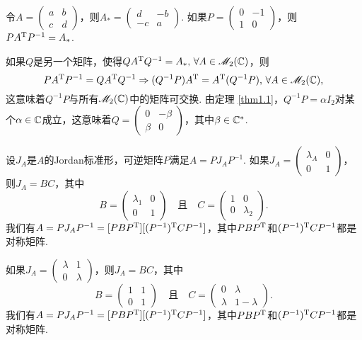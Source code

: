 \begin{solution}
  令$A=\begin{pmatrix}
    a & b \\
    c & d
  \end{pmatrix}$，则$A_\ast=\begin{pmatrix}
    d & -b \\
    -c & a
  \end{pmatrix}$. 如果$P=\begin{pmatrix}
    0 & -1 \\
    1 & 0
  \end{pmatrix}$，则$PA^{\mathrm T} P^{-1}=A_\ast$.

  如果$Q$是另一个矩阵，使得$QA^{\mathrm T} Q^{-1}=A_\ast,\,\forall A\in\mathscr M_2(\mathbb C)$，则
  \[
    PA^{\mathrm T} P^{-1}=QA^{\mathrm T} Q^{-1}\Rightarrow (Q^{-1}P)A^{\mathrm T}=A^{\mathrm T}(Q^{-1}P),\,\forall A\in\mathscr M_2(\mathbb C),
  \]
  这意味着$Q^{-1}P$与所有$\mathscr M_2(\mathbb C)$中的矩阵可交换. 由定理 \ref{thm1.1}，$Q^{-1}P=\alpha I_2$对某个$\alpha\in\mathbb C$成立，这意味着$Q=\begin{pmatrix}
    0 & -\beta \\
    \beta & 0
  \end{pmatrix}$，其中$\beta\in\mathbb C^\ast$.
\end{solution}

\begin{solution}
  设$J_A$是$A$的Jordan标准形，可逆矩阵$P$满足$A=PJ_AP^{-1}$. 如果$J_A=\begin{pmatrix}
    \lambda_A & 0 \\
    0 & 1
  \end{pmatrix}$，则$J_A=BC$，其中
  \[
    B = \begin{pmatrix}
      \lambda_1 & 0 \\
      0 & 1
    \end{pmatrix} \quad \text{且} \quad
    C = \begin{pmatrix}
      1 & 0 \\
      0 & \lambda_2
    \end{pmatrix}.
  \]
  我们有$A=PJ_AP^{-1}=[PBP^{\mathrm T}][(P^{-1})^{\mathrm T} CP^{-1}]$，其中$PBP^{\mathrm T}$和$(P^{-1})^{\mathrm T} CP^{-1}$都是对称矩阵.

  如果$J_A=\begin{pmatrix}
    \lambda & 1 \\
    0 & \lambda
  \end{pmatrix}$，则$J_A = BC$，其中
  \[
    B = \begin{pmatrix}
      1 & 1 \\
      0 & 1
    \end{pmatrix} \quad \text{且} \quad
    C = \begin{pmatrix}
      0 & \lambda \\
      \lambda & 1 - \lambda
    \end{pmatrix}.
  \]
  我们有$A=PJ_AP^{-1}=[PBP^{\mathrm T}][(P^{-1})^{\mathrm T} CP^{-1}]$，其中$PBP^{\mathrm T}$和$(P^{-1})^{\mathrm T} CP^{-1}$都是对称矩阵.
\end{solution}

